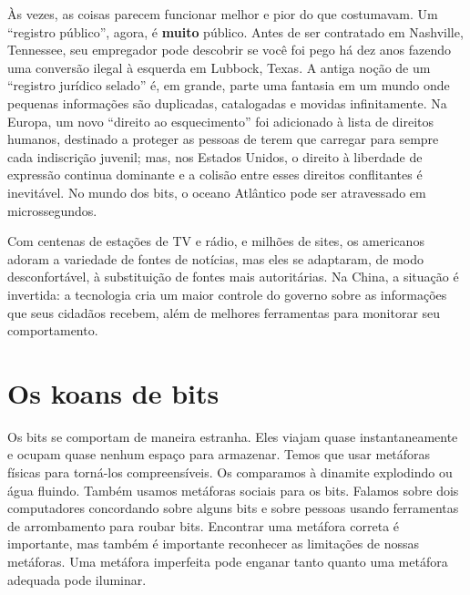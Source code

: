 Às vezes, as coisas parecem funcionar melhor e pior do que costumavam. Um
``registro público'', agora, é
\textbf{muito} público. Antes de ser contratado
em Nashville, Tennessee, seu empregador pode descobrir se você foi pego há dez
anos fazendo uma conversão ilegal à esquerda em Lubbock, Texas. A antiga noção
de um ``registro jurídico selado'' é, em grande, parte uma fantasia em um mundo
onde pequenas informações são duplicadas, catalogadas e movidas
infinitamente. Na Europa, um novo ``direito ao esquecimento'' foi adicionado à
lista de direitos humanos, destinado a proteger as pessoas de terem que carregar
para sempre cada indiscrição juvenil; mas, nos Estados Unidos, o direito à
liberdade de expressão continua dominante e a colisão entre esses direitos
conflitantes é inevitável. No mundo dos bits, o oceano Atlântico pode ser
atravessado em microssegundos.

Com centenas de estações de TV e rádio, e milhões de sites, os americanos adoram
a variedade de fontes de notícias, mas eles se adaptaram, de modo
desconfortável, à substituição de fontes mais autoritárias. Na China, a situação
é invertida: a tecnologia cria um maior controle do governo sobre as informações
que seus cidadãos recebem, além de melhores ferramentas para monitorar seu
comportamento.

\section{Os koans de bits}
\label{cap1:exp-dig-koans}

Os bits se comportam de maneira estranha. Eles viajam quase instantaneamente e 
ocupam quase nenhum espaço para armazenar. Temos que usar metáforas físicas para
torná-los compreensíveis. Os comparamos à dinamite
explodindo ou água fluindo. 
Também usamos metáforas sociais para os bits. Falamos sobre dois computadores
concordando sobre alguns bits e sobre pessoas usando ferramentas de arrombamento
para roubar bits. Encontrar uma metáfora correta é importante, mas também é
importante reconhecer as limitações de nossas metáforas. Uma metáfora imperfeita
pode enganar tanto quanto uma metáfora adequada pode iluminar.

